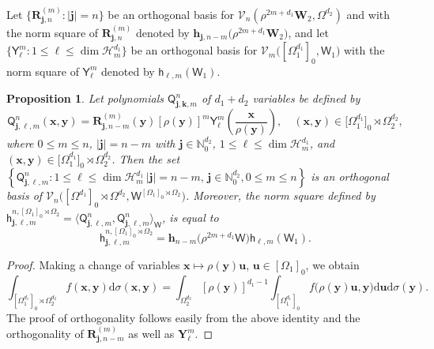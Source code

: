\documentclass{amsart}
\newtheorem{prop}[thm]{Proposition}
\theoremstyle{remark}
\def\la{{\langle}}
\def\ra{{\rangle}}
\def\d{\mathrm{d}}
\def\sh{{\mathsf h}}
\def\sQ{{\mathsf Q}}
\def\sW{{\mathsf W}}
\def\sY{{\mathsf Y}}
\def\s{\sigma}
\def\la{{\langle}}
\def\ra{{\rangle}}
\def\jb{{\bm j}}
\def\hb{{\bm h}}
\def\kb{{\bm k}}
\def\ub{{\bm u}}
\def\xb{{\bm x}}
\def\yb{{\bm y}}
\def\Rb{{\bm R}}
\def\Wb{{\bm W}}
\def\Yb{{\bm Y}}
\def\CH{{\mathcal H}}
\def\CV{{\mathcal V}}
\def\NN{{\mathbb N}}
\def\VV{{\mathbb V}}
\begin{document}
Let $\big\{\Rb_{\jb, n}^{(m)}: |\jb|=n\big\}$ be an orthogonal basis for $\CV_n (\rho^{2m+d_1} \Wb_2, \Omega^{d_2})$ 
and with the norm square of $\Rb_{\jb, n}^{(m)}$ denoted by $\hb_{\jb, n-m}\big(\rho^{2m+d_1}\Wb_2\big)$, and let 
$\{\sY_\ell^m: 1 \le \ell \le \dim \CH_m^{d_1}\}$ be an orthogonal basis for $\CV_m\big([\Omega_1^{d_1}]_0, \sW_1\big)$
with the norm square of $\sY_\ell^m$ denoted by $\sh_{\ell, m}(\sW_1)$. 

\begin{prop}\label{prop:OP_Wrap0}
Let polynomials $\sQ_{\jb, \kb, m}^n$ of $d_1+d_2$ variables be defined by
\begin{equation*}%
   \sQ_{\jb, \ell, m}^n(\xb, \yb) = \Rb_{\jb,n-m}^{(m)}(\yb) [\rho(\yb)]^m \sY_{\ell}^m \left(\frac{\xb}{\rho(\yb)}\right),  \quad
   (\xb,\yb) \in \big[\Omega_1^{d_1}\big]_0 \rtimes \Omega_2^{d_2},
\end{equation*}
where $0 \le m \le n$, $|\jb| = n-m$ with $\jb \in \NN_0^{d_2}$, $1\le \ell \le \dim \CH_m^{d_1}$, and $(\xb,\yb)\in
\big[\Omega_1^{d_1}\big]_0 \rtimes \Omega_2^{d_2}$. 
Then the set $\left\{\sQ_{\jb, \ell, m}^n: 1 \le \ell \le \dim \CH_m^{d_1} \,  |\jb| = n-m, \, \jb \in \NN_0^{d_2}, 0 \le m \le n\right\}$ 
is an orthogonal basis of $\CV_n\big([\Omega^{d_1}]_0 \! \rtimes \Omega^{d_2},\sW^{[\Omega_1]_0 \rtimes \Omega_2}\big)$.
Moreover, the norm square defined by %
$\sh_{\jb, \ell, m}^{n, [\Omega_1]_0 \rtimes \Omega_2} 
= \la  \sQ_{\jb, \ell, m}^n, \sQ_{\jb, \ell, m}^n\ra_\sW$, is equal to 
$$
\sh_{\jb,\ell, m}^{n, [\Omega_1]_0 \rtimes \Omega_2} = \hb_{n-m}\big(\rho^{2m+d_1}\sW\big) \sh_{\ell, m}(\sW_1).
$$
\end{prop}

\begin{proof}
Making a change of variables $\xb \mapsto \rho(\yb) \ub$, $\ub \in [\Omega_1]_0$, we obtain
$$
 \int_{[\Omega_1^{d_1}]_0 \rtimes \Omega_2^{d_2}} f(\xb,\yb) \d \sigma(\xb,\yb) =
   \int_{\Omega_2^{d_2}}[\rho(\yb)]^{d_1-1}  \int_{[\Omega_1^{d_1}]_0}  f\big (\rho(\yb) \ub, \yb\big ) \d \ub \d\s(\yb).
$$
The proof of orthogonality follows easily from the above identity and the orthogonality of 
$ \Rb_{\jb,n-m}^{(m)}$ as well as $\Yb_\ell^m$. 
\end{proof}
\end{document}
